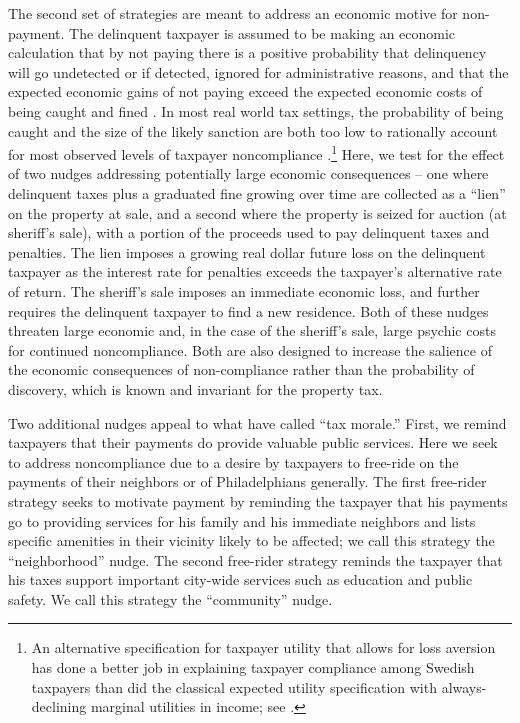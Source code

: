 \documentclass[12pt]{article}
\begin{document}
The second set of strategies are meant to address an economic motive
for non-payment.  The delinquent taxpayer is assumed to be making an
economic calculation that by not paying there is a positive
probability that delinquency will go undetected or if detected,
ignored for administrative reasons, and that the expected economic
gains of not paying exceed the expected economic costs of being caught
and fined \cite{Allingham-Sandmo-72}.  In most real world tax
settings, the probability of being caught and the size of the
likely sanction are both too low to rationally account for most
observed levels of taxpayer noncompliance \cite{Alm-92}.\footnote{An
  alternative specification for taxpayer utility that allows for loss
  aversion has done a better job in explaining taxpayer compliance
  among Swedish taxpayers than did the classical expected utility
  specification with always-declining marginal utilities in income;
  see . } Here, we test for the effect of two nudges
addressing potentially large economic consequences -- one where delinquent
taxes plus a graduated fine growing over time are collected as a
``lien'' on the property at sale, and a second where the property
is seized for auction (at sheriff's sale), with a portion of the
proceeds used to pay delinquent taxes and penalties. The lien imposes
a growing real dollar future loss on the delinquent taxpayer as the
interest rate for penalties exceeds the taxpayer's alternative rate
of return. The sheriff's sale imposes an immediate economic loss,
and further requires the delinquent taxpayer to find a new residence.
Both of these nudges threaten large economic and, in the case of the
sheriff's sale, large psychic costs for continued noncompliance. Both
are also designed to increase the salience of the economic consequences
of non-compliance\cite{Bhargava-15} rather than the probability of 
discovery\cite{delcarpio}, which is known and invariant for the property tax.

Two additional nudges appeal to what  have called
``tax morale.''  First, we remind taxpayers that their payments do
provide valuable public services.  Here we seek to address
noncompliance due to a desire by taxpayers to free-ride on the
payments of their neighbors or of Philadelphians generally.  The first
free-rider strategy seeks to motivate payment by reminding the
taxpayer that his payments go to providing services for his family and
his immediate neighbors and lists specific amenities in their vicinity
likely to be affected; we call this strategy the ``neighborhood''
nudge.  The second free-rider strategy reminds the taxpayer that his
taxes support important city-wide services such as education and public
safety. We call this strategy the ``community'' nudge.
  
\end{document}
